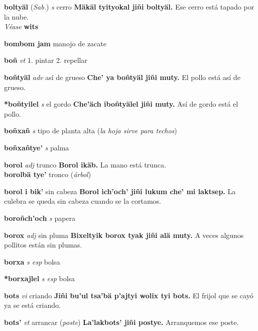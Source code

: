 \documentclass[10pt]{scrbook}
\newcommand{\entry}[1]{\textbf{#1}}
\newcommand{\onedefinition}[1]{#1.}
\newcommand{\partofspeech}[1]{\textit{#1}}
\newcommand{\spanishtranslation}[1]{#1}
\newcommand{\clarification}[1]{(\textit{#1})}
\newcommand{\cholexample}[1]{\textbf{#1}}
\newcommand{\exampletranslation}[1]{#1}
\newcommand{\alsosee}[1]{\\\textit{Véase} \textbf{#1}}
\newcommand{\relevantdialect}[1]{(\textit{#1})}
\newcommand{\secondaryentry}[1]{\\\textbf{#1}}
\newcommand{\secondtranslation}[1]{#1}
\begin{document}
\begin{multicols}{2}
\entry{boltyäl}
\relevantdialect{Sab.}
\partofspeech{s}
\spanishtranslation{cerro}
\cholexample{Mäkäl tyityokal jiñi boltyäl.}
\exampletranslation{Ese cerro está tapado por la nube.}
\alsosee{wits}

\entry{bombom jam}
\spanishtranslation{manojo de zacate}

\entry{boñ}
\partofspeech{vt}
\onedefinition{1}
\spanishtranslation{pintar}
\onedefinition{2}
\spanishtranslation{repellar}

\entry{boñtyäl}
\partofspeech{adv}
\spanishtranslation{así de grueso}
\cholexample{Che' ya boñtyäl jiñi muty.}
\exampletranslation{El pollo está así de grueso.}

\entry{*boñtyilel}
\partofspeech{s}
\spanishtranslation{el gordo}
\cholexample{Che'äch iboñtyälel jiñi muty.}
\exampletranslation{Así de gordo está el pollo.}

\entry{boñxañ}
\partofspeech{s}
\spanishtranslation{tipo de planta alta}
\clarification{la hoja sirve para techos}

\entry{boñxañtye'}
\partofspeech{s}
\spanishtranslation{palma}

\entry{borol}
\partofspeech{adj}
\spanishtranslation{trunco}
\cholexample{Borol ikäb.}
\exampletranslation{La mano está trunca.}
\secondaryentry{borolbä tye'}
\secondtranslation{tronco}
\clarification{árbol}

\entry{borol i bik'}
\spanishtranslation{sin cabeza}
\cholexample{Borol ich'och' jiñi lukum che' mi laktsep.}
\exampletranslation{La culebra se queda sin cabeza cuando se la cortamos.}

\entry{boroñch'och}
\partofspeech{s}
\spanishtranslation{papera}

\entry{borox}
\partofspeech{adj}
\spanishtranslation{sin pluma}
\cholexample{Bixeltyik borox tyak jiñi alä muty.}
\exampletranslation{A veces algunos pollitos están sin plumas.}

\entry{borxa}
\partofspeech{s esp}
\spanishtranslation{bolsa}

\entry{*borxajlel}
\partofspeech{s esp}
\spanishtranslation{bolsa}

\entry{bots}
\partofspeech{vi}
\spanishtranslation{criando}
\cholexample{Jiñi bu'ul tsa'bä p'ajtyi wolix tyi bots.}
\exampletranslation{El frijol que se cayó ya se está criando.}

\entry{bots'}
\partofspeech{vt}
\spanishtranslation{arrancar}
\clarification{poste}
\cholexample{La'lakbots' jiñi postye.}
\exampletranslation{Arranquemos ese poste.}


\end{multicols}
\end{document}
